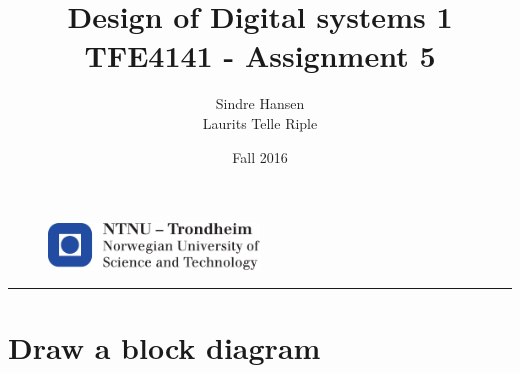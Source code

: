 \documentclass{article}
\title{Design of Digital systems 1 TFE4141 - Assignment 5}
\author{Sindre Hansen \\ Laurits Telle Riple}
\date{Fall 2016}
\begin{document}
\begin{figure}
  \centering
  \includegraphics[width=0.5\textwidth]{images/logontnu_eng}
\end{figure}
\maketitle
\rule{\linewidth}{0.5mm}

\section{Draw a block diagram}
\end{document}
